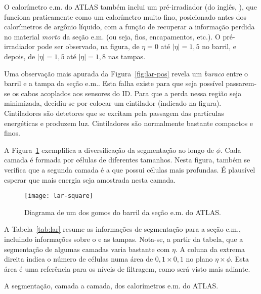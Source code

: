 O calo\-rí\-metro e.m. do ATLAS tam\-bém inclui um pré-irradiador (do inglês,
), que funciona praticamente como um calo\-rí\-metro muito
fino, posicionado antes dos calo\-rí\-metros de ar\-gô\-nio lí\-quido, com a
função de recuperar a informação perdida no material \textit{morto} da seção
e.m. (ou seja, fios, encapamentos, etc.). O pré-irradiador pode ser observado,
na figura, de $\eta=0$ até $|\eta|=1,5$ no barril, e depois, de $|\eta|=1,5$
até $|\eta|=1,8$ nas tampas.

Uma observação mais apurada da Figura~\ref{fig:lar-pos} revela um
\textit{buraco} entre o barril e a tampa da seção e.m.. Esta falha existe para
que seja possível passarem-se os cabos acoplados aos sensores do ID. Para que
a perda nessa região seja minimizada, decidiu-se por colocar um cintilador
(indicado na figura). Cintiladores são detetores que se excitam pela passagem
das partículas energéticas e produzem luz. Cintiladores são normalmente
bastante compactos e finos.

A Figura~\ref{fig:lar-detail} exemplifica a diversificação da segmentação ao
longo de $\phi$. Cada camada é formada por células de diferentes
tamanhos. Nesta figura, também se verifica que a segunda camada é a que possui
células mais profundas. É plausível esperar que mais energia seja amostrada
nesta camada.

\begin{figure}
\begin{center}
\texttt{[image: lar-square]}
\end{center}
\caption{Diagrama de um dos gomos do barril da seção e.m. do ATLAS.}
\label{fig:lar-detail}
\end{figure}

A Tabela~\ref{tab:lar} resume as informações de segmentação para a seção e.m.,
incluindo informações sobre o  e as tampas. Nota-se, a partir
da tabela, que a segmentação de algumas camadas varia bastante com $\eta$. A
coluna da extrema direita indica o número de células numa área de
$0,1\times0,1$ no plano $\eta\times\phi$. Esta área é uma referência para os
níveis de filtragem, como será visto mais adiante.

\begin{table}
\caption{A segmentação, camada a camada, dos calo\-rí\-metros e.m. do ATLAS.}
\label{tab:lar}
\begin{center}

\end{center}
\end{table}

